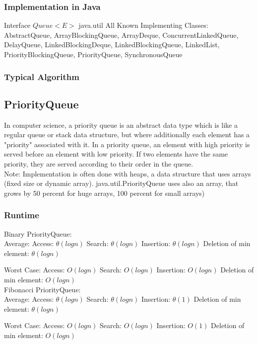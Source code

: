 \documentclass[12pt,a4paper]{article}
\newcommand{\RuntimeHead}{Runtime}
\newcommand{\ImplementationInJavaHead}{Implementation in Java}
\newcommand{\TypicalAlgorithmHead}{Typical Algorithm}
\begin{document}
\subsubsection{\ImplementationInJavaHead}
Interface $Queue<E>$ java.util 
All Known Implementing Classes:\\
AbstractQueue, ArrayBlockingQueue, ArrayDeque, ConcurrentLinkedQueue, DelayQueue, LinkedBlockingDeque, LinkedBlockingQueue, LinkedList, PriorityBlockingQueue, PriorityQueue, SynchronousQueue
\subsubsection{\TypicalAlgorithmHead}


\subsection{PriorityQueue}
In computer science, a priority queue is an abstract data type which is like a regular queue or stack data structure, but where additionally each element has a "priority" associated with it. In a priority queue, an element with high priority is served before an element with low priority. If two elements have the same priority, they are served according to their order in the queue.\\
Note: Implementation is often done with heaps, a data structure that uses arrays (fixed size or dynamic array). java.util.PriorityQueue uses also an array, that grows by 50 percent for huge arrays, 100 percent for small arrays)
\subsubsection{\RuntimeHead}
Binary PriorityQueue:\\
Average: 
Access: $\theta(log n)  $
Search: $\theta(log n) $
Insertion: $ \theta(log n)$ 
Deletion of min element: $\theta (log n)$ 

Worst Case: 
Access: $O(log n)$  
Search: $O(log n) $
Insertion: $O(log n)$ 
Deletion of min element: $O(log n)$ 
\\
\newline
Fibonacci PriorityQueue:\\
Average: 
Access: $\theta(log n)  $
Search: $\theta(log n) $
Insertion: $ \theta(1)$ 
Deletion of min element: $\theta (log n)$ 

Worst Case: 
Access: $O(log n)$  
Search: $O(log n) $
Insertion: $O(1)$ 
Deletion of min element: $O(log n)$ 
\newline
\end{document}
